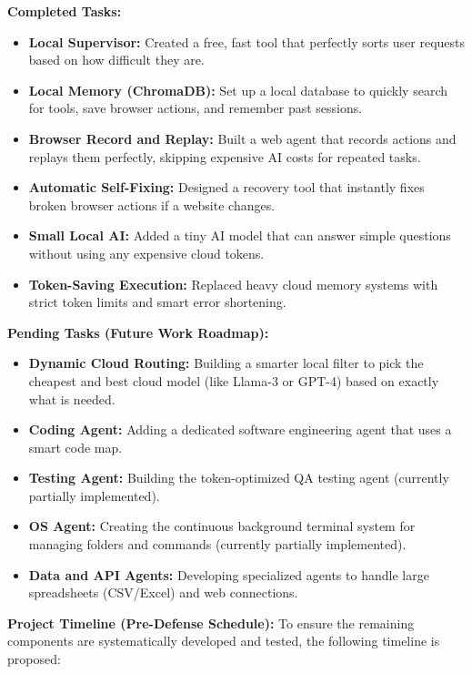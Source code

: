 \textbf{Completed Tasks:}
\begin{itemize}
    \item \textbf{Local Supervisor:} Created a free, fast tool that perfectly sorts user requests based on how difficult they are.
    \item \textbf{Local Memory (ChromaDB):} Set up a local database to quickly search for tools, save browser actions, and remember past sessions.
    \item \textbf{Browser Record and Replay:} Built a web agent that records actions and replays them perfectly, skipping expensive AI costs for repeated tasks.
    \item \textbf{Automatic Self-Fixing:} Designed a recovery tool that instantly fixes broken browser actions if a website changes.
    \item \textbf{Small Local AI:} Added a tiny AI model that can answer simple questions without using any expensive cloud tokens.
    \item \textbf{Token-Saving Execution:} Replaced heavy cloud memory systems with strict token limits and smart error shortening.
\end{itemize}

\textbf{Pending Tasks (Future Work Roadmap):}
\begin{itemize}
    \item \textbf{Dynamic Cloud Routing:} Building a smarter local filter to pick the cheapest and best cloud model (like Llama-3 or GPT-4) based on exactly what is needed.
    \item \textbf{Coding Agent:} Adding a dedicated software engineering agent that uses a smart code map.
    \item \textbf{Testing Agent:} Building the token-optimized QA testing agent (currently partially implemented).
    \item \textbf{OS Agent:} Creating the continuous background terminal system for managing folders and commands (currently partially implemented).
    \item \textbf{Data and API Agents:} Developing specialized agents to handle large spreadsheets (CSV/Excel) and web connections.
\end{itemize}

\textbf{Project Timeline (Pre-Defense Schedule):}
To ensure the remaining components are systematically developed and tested, the following timeline is proposed:\\

